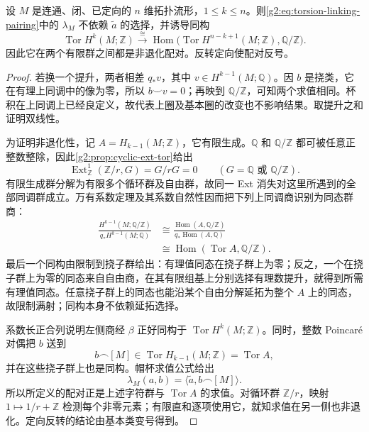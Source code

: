 \begin{theorem}\label{g2:thm:torsion-linking-perfect}
	设 \(M\) 是连通、闭、已定向的 \(n\) 维拓扑流形，\(1\leq k\leq n\)。则\eqref{g2:eq:torsion-linking-pairing}中的 \(\lambda_M\) 不依赖 \(\widetilde a\) 的选择，并诱导同构
	\[
		\operatorname{Tor}H^k(M;\mathbb Z)
		\xrightarrow{\ \cong\ }
		\operatorname{Hom}\bigl(\operatorname{Tor}H^{n-k+1}(M;\mathbb Z),\mathbb Q/\mathbb Z\bigr).
	\]
	因此它在两个有限群之间都是非退化配对。反转定向使配对反号。
\end{theorem}
\begin{proof}
	若换一个提升，两者相差 \(q_*v\)，其中 \(v\in H^{k-1}(M;\mathbb Q)\)。因 \(b\) 是挠类，它在有理上同调中的像为零，所以 \(b\smile v=0\)；再映到 \(\mathbb Q/\mathbb Z\)，可知两个求值相同。杯积在上同调上已经良定义，故代表上圈及基本圈的改变也不影响结果。取提升之和证明双线性。

	为证明非退化性，记 \(A=H_{k-1}(M;\mathbb Z)\)，它有限生成。\(\mathbb Q\) 和 \(\mathbb Q/\mathbb Z\) 都可被任意正整数整除，因此\cref{g2:prop:cyclic-ext-tor}给出
	\[
		\operatorname{Ext}^1_{\mathbb Z}(\mathbb Z/r,G)=G/rG=0
		\qquad(G=\mathbb Q\text{ 或 }\mathbb Q/\mathbb Z).
	\]
	有限生成群分解为有限多个循环群及自由群，故同一 Ext 消失对这里所遇到的全部同调群成立。万有系数定理及其系数自然性因而把下列上同调商识别为同态群商：
	\[
	\begin{aligned}
		\frac{H^{k-1}(M;\mathbb Q/\mathbb Z)}{q_*H^{k-1}(M;\mathbb Q)}
		&\cong\frac{\operatorname{Hom}(A,\mathbb Q/\mathbb Z)}{q_*\operatorname{Hom}(A,\mathbb Q)}\\
		&\cong\operatorname{Hom}(\operatorname{Tor}A,\mathbb Q/\mathbb Z).
	\end{aligned}
	\]
	最后一个同构由限制到挠子群给出：有理值同态在挠子群上为零；反之，一个在挠子群上为零的同态来自自由商，在其有限组基上分别选择有理数提升，就得到所需有理值同态。任意挠子群上的同态也能沿某个自由分解延拓为整个 \(A\) 上的同态，故限制满射；同构本身不依赖延拓选择。

	系数长正合列说明左侧商经 \(\beta\) 正好同构于 \(\operatorname{Tor}H^k(M;\mathbb Z)\)。同时，整数 Poincaré 对偶把 \(b\) 送到
	\[
		b\frown[M]\in\operatorname{Tor}H_{k-1}(M;\mathbb Z)=\operatorname{Tor}A,
	\]
	并在这些挠子群上也是同构。帽杯求值公式给出
	\[
		\lambda_M(a,b)=\langle\widetilde a,b\frown[M]\rangle.
	\]
	所以所定义的配对正是上述字符群与 \(\operatorname{Tor}A\) 的求值。对循环群 \(\mathbb Z/r\)，映射 \(1\mapsto1/r+\mathbb Z\) 检测每个非零元素；有限直和逐项使用它，就知求值在另一侧也非退化。定向反转的结论由基本类变号得到。
\end{proof}

